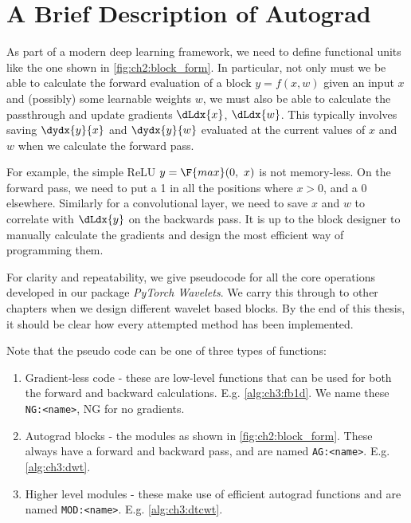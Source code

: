 \section{A Brief Description of Autograd}
As part of a modern deep learning framework, we need to define functional units like 
the one shown in \autoref{fig:ch2:block_form}. In particular, not only must we
be able to calculate the forward evaluation of a block $y=f(x,w)$ given an input $x$ and 
(possibly) some learnable weights $w$, we must also be able to
calculate the passthrough and update gradients $\dLdx{x}$, $\dLdx{w}$. This
typically involves saving $\dydx{y}{x}$ and $\dydx{y}{w}$ evaluated at the current
values of $x$ and $w$ when we calculate the forward pass. 

For example, the simple ReLU $y = \F{max}(0,\ x)$ is not memory-less. On the
forward pass, we need to put a 1 in all the positions where $x > 0$, and a 0
elsewhere. Similarly for a convolutional layer, we need to save $x$ and $w$ to
correlate with $\dLdx{y}$ on the backwards pass. It is up to the block designer
to manually calculate the gradients and design the most efficient way of
programming them.

For clarity and repeatability, we give pseudocode for all the core operations
developed in our package \emph{PyTorch Wavelets}. We carry this through to other chapters
when we design different wavelet based blocks. By the end of this thesis, it should be
clear how every attempted method has been implemented.


Note that the pseudo code can be one of three types of functions:
\begin{enumerate}
  \item Gradient-less code - these are low-level functions that can be used for
    both the forward and backward calculations. E.g. \autoref{alg:ch3:fb1d}. We
    name these \texttt{NG:<name>}, NG for no gradients.
  \item Autograd blocks - the modules as shown in
    \autoref{fig:ch2:block_form}. These always have a forward and backward pass, and 
    are named \texttt{AG:<name>}. E.g. \autoref{alg:ch3:dwt}.
  \item Higher level modules - these make use of efficient autograd functions
    and are named \texttt{MOD:<name>}. E.g. \autoref{alg:ch3:dtcwt}.
\end{enumerate}

